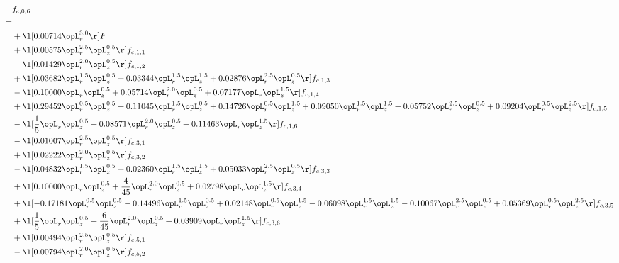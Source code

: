 \begin{alignat}{2} 
\label{eq:f_06_2} 
& f_{c,0,6} \nonumber \\ 
 = \\ 
& + \l[  0.00714 \opL_r^{3.0}  \r] F \nonumber \\ 
& + \l[  0.00575 \opL_r^{2.5} \opL_z^{0.5}  \r] f_{c,1,1} \nonumber \\ 
& - \l[  0.01429 \opL_r^{2.0} \opL_z^{0.5}  \r] f_{c,1,2} \nonumber \\ 
& + \l[  0.03682 \opL_r^{1.5} \opL_z^{0.5} +  0.03344 \opL_r^{1.5} \opL_z^{1.5} +  0.02876 \opL_r^{2.5} \opL_z^{0.5}  \r] f_{c,1,3} \nonumber \\ 
& - \l[  0.10000 \opL_r \opL_z^{0.5} +  0.05714 \opL_r^{2.0} \opL_z^{0.5} +  0.07177 \opL_r \opL_z^{1.5}  \r] f_{c,1,4} \nonumber \\ 
& + \l[  0.29452 \opL_r^{0.5} \opL_z^{0.5} +  0.11045 \opL_r^{1.5} \opL_z^{0.5} +  0.14726 \opL_r^{0.5} \opL_z^{1.5} +  0.09050 \opL_r^{1.5} \opL_z^{1.5} +  0.05752 \opL_r^{2.5} \opL_z^{0.5} +  0.09204 \opL_r^{0.5} \opL_z^{2.5}  \r] f_{c,1,5} \nonumber \\ 
& - \l[ \frac{1}{5} \opL_r \opL_z^{0.5} +  0.08571 \opL_r^{2.0} \opL_z^{0.5} +  0.11463 \opL_r \opL_z^{1.5}  \r] f_{c,1,6} \nonumber \\ 
& - \l[  0.01007 \opL_r^{2.5} \opL_z^{0.5}  \r] f_{c,3,1} \nonumber \\ 
& + \l[  0.02222 \opL_r^{2.0} \opL_z^{0.5}  \r] f_{c,3,2} \nonumber \\ 
& - \l[  0.04832 \opL_r^{1.5} \opL_z^{0.5} +  0.02360 \opL_r^{1.5} \opL_z^{1.5} +  0.05033 \opL_r^{2.5} \opL_z^{0.5}  \r] f_{c,3,3} \nonumber \\ 
& + \l[  0.10000 \opL_r \opL_z^{0.5} + \frac{4}{45} \opL_r^{2.0} \opL_z^{0.5} +  0.02798 \opL_r \opL_z^{1.5}  \r] f_{c,3,4} \nonumber \\ 
& + \l[  -0.17181 \opL_r^{0.5} \opL_z^{0.5}   -0.14496 \opL_r^{1.5} \opL_z^{0.5} +  0.02148 \opL_r^{0.5} \opL_z^{1.5}   -0.06098 \opL_r^{1.5} \opL_z^{1.5}   -0.10067 \opL_r^{2.5} \opL_z^{0.5} +  0.05369 \opL_r^{0.5} \opL_z^{2.5}  \r] f_{c,3,5} \nonumber \\ 
& + \l[ \frac{1}{5} \opL_r \opL_z^{0.5} + \frac{6}{45} \opL_r^{2.0} \opL_z^{0.5} +  0.03909 \opL_r \opL_z^{1.5}  \r] f_{c,3,6} \nonumber \\ 
& + \l[  0.00494 \opL_r^{2.5} \opL_z^{0.5}  \r] f_{c,5,1} \nonumber \\ 
& - \l[  0.00794 \opL_r^{2.0} \opL_z^{0.5}  \r] f_{c,5,2} \nonumber \\ 

\end{alignat}
